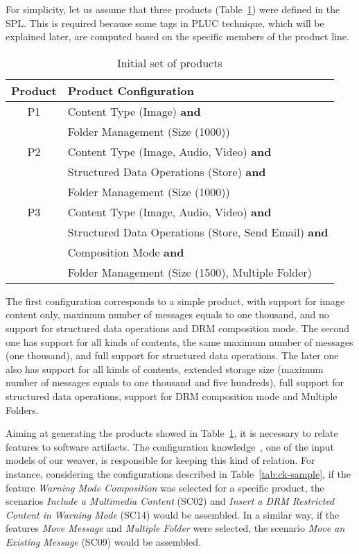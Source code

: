 \documentclass{acm_proc_article-sp}
\begin{document}
For simplicity, let us assume that three products (Table~\ref{tab:initial-products}) were defined in the SPL. 
This is required because some tags in PLUC technique, which will be explained later, are computed based on the specific members 
of the product line. 

\begin{table}[hb]
\centering
\caption{Initial set of products}
\label{tab:initial-products}
\begin{small}
\begin{tabular}{|c|l|} \hline
Product & Product Configuration \\ \hline
P1  & Content Type (Image) {\bf and} \\ 
      & Folder Management (Size (1000))\\ \hline
P2  & Content Type (Image, Audio, Video) {\bf and} \\ 
      & Structured Data Operations (Store) {\bf and} \\ 
      & Folder Management (Size (1000))  \\ \hline
P3  & Content Type (Image, Audio, Video) {\bf and} \\ 
      & Structured Data Operations (Store, Send Email) {\bf and}\\
      & Composition Mode {\bf and} \\
      & Folder Management (Size (1500), Multiple Folder)  \\ \hline 
\end{tabular}
\end{small}
\end{table}

The first configuration corresponds to a simple product, with support for image content only, maximum number of messages equals to one thousand, and no support for structured data operations and DRM composition mode. The second one has support for all kinds of contents, the same maximum number of messages (one thousand), and full support for structured data operations. The later one also has support for all kinds of contents, extended storage size (maximum number of messages equals to one thousand and five hundreds), full support for structured data operations, support for DRM composition mode and Multiple Folders. 

Aiming at generating the products showed in Table~\ref{tab:initial-products}, it is necessary to relate features to software artifacts. The configuration knowledge~\cite{czarnecki-book, phol-spl-book}, one of the input models of our weaver, is responsible for keeping this kind of relation. For instance, considering the configurations described in Table~\ref{tab:ck-sample}, if the feature \emph{Warning Mode Composition} was selected for a specific product, the scenarios \emph{Include a Multimedia Content} (SC02) and \emph{Insert a DRM Restricted Content in Warning Mode} (SC14) would be assembled. In a similar way, if the features \emph{Move Message} and \emph{Multiple Folder} were selected, the scenario \emph{Move an Existing Message} (SC09) would be assembled. 
\end{document}
